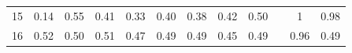 \documentclass[twoside,11pt]{article}
\begin{document}
\begin{table}[H]
{\begin{tabular}{ccccccccclcc}
\multicolumn{1}{|c|}{15}                                                                          & \multicolumn{1}{c|}{0.14}                                                           & \multicolumn{1}{c|}{\cellcolor[HTML]{FFCCC9}0.55}                                              & \multicolumn{1}{c|}{0.41}                                                                & \multicolumn{1}{c|}{0.33}                                                                & \multicolumn{1}{c|}{0.40}                                                                & \multicolumn{1}{c|}{0.38}                                                                   & \multicolumn{1}{c|}{0.42}                                                                   & \multicolumn{1}{c|}{\cellcolor[HTML]{ECF4FF}0.50}                                           & \multicolumn{1}{l|}{}                    & \multicolumn{1}{c|}{\cellcolor[HTML]{67FD9A}1}                                                 & \multicolumn{1}{c|}{0.98}                                                                      \\ \cline{1-1}
\multicolumn{1}{|c|}{16}                                                                          & \multicolumn{1}{c|}{0.52}                                                           & \multicolumn{1}{c|}{\cellcolor[HTML]{ECF4FF}0.50}                                              & \multicolumn{1}{c|}{\cellcolor[HTML]{FFCCC9}0.51}                                        & \multicolumn{1}{c|}{0.47}                                                                & \multicolumn{1}{c|}{0.49}                                                                & \multicolumn{1}{c|}{0.49}                                                                   & \multicolumn{1}{c|}{0.45}                                                                   & \multicolumn{1}{c|}{0.49}                                                                   & \multicolumn{1}{l|}{}                    & \multicolumn{1}{c|}{\cellcolor[HTML]{67FD9A}0.96}                                              & \multicolumn{1}{c|}{0.49}                                                                      \\ \cline{1-1}

\end{tabular}}
\end{table}
\end{document}
